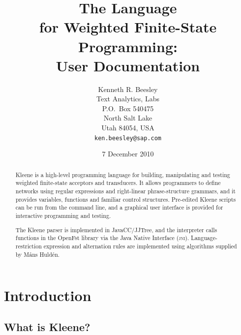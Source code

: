 \documentclass[letterpaper,12pt]{article}
\title{The \Kleene{} Language\\
for Weighted Finite-State Programming:\\
{\Large User Documentation}}
\author{Kenneth R. Beesley\\
Text Analytics, \acro{sap} Labs\\
P.O.~Box 540475\\
North Salt Lake\\
Utah 84054, USA\\
\texttt{ken.beesley@sap.com}}
\date{7 December 2010}
\newcommand{\Kleene}{Kleene\xspace}
\newcommand{\acro}{\textsc}
\begin{document}

\VerbatimFootnotes

\maketitle





\begin{abstract}
\Kleene{} is a high-level programming language for building,
manipulating and testing weighted 
finite-state acceptors and transducers.
It allows programmers to define networks using regular expressions and
right-linear phrase-structure grammars, and it provides variables, functions and familiar
control structures.  Pre-edited \Kleene{}
scripts can be run from the command line, and a graphical user
interface is provided for interactive programming and testing.

The \Kleene{} parser is implemented in JavaCC/JJTree, and the
interpreter calls functions in the OpenFst library via the Java
Native Interface (\acro{jni}).
Language-restriction expression and alternation rules are implemented using
algorithms supplied by M\r{a}ns Huld\'en. 
\end{abstract}


\newpage
\tableofcontents

\cleardoublepage

\section{Introduction}

\subsection{What is Kleene?}
\end{document}
